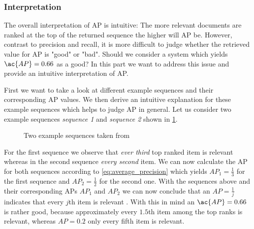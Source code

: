 \subsubsection{Interpretation}
\label{chp:fundamentals:sec:metrics:subsec:average_precision:interpretation}
The overall interpretation of \ac{AP} is intuitive: The more relevant documents are ranked at the top of the returned sequence the higher will \ac{AP} be.
However, contrast to precision and recall, it is more difficult to judge whether the retrieved value for \ac{AP} is "good" or "bad".
Should we consider a system which yields $\ac{AP}=0.66$ as a good?
In this part we want to address this issue and provide an intuitive interpretation of \ac{AP}.

First we want to take a look at different example sequences and their corresponding \ac{AP} values.
We then derive an intuitive explanation for these example sequences which helps to judge \ac{AP} in general.
Let us consider two example sequences \textit{sequence 1} and \textit{sequence 2} shown in \cref{fig:metrics:average_precision:interpreation:sample}.

\begin{figure}[htpb]
    \centering
    \def\svgwidth{\columnwidth}
    
    \caption[Two Example Sequences]{Two example sequences taken from \textcite{Tapaswi:2012}}\label{fig:metrics:average_precision:interpreation:sample}
\end{figure}

For the first sequence we observe that \textit{ever third} top ranked item is relevant whereas in the second sequence \textit{every second} item.
We can now calculate the \ac{AP} for both sequences according to \cref{eq:average_precision} which yields $AP_1= \frac{1}{3}$ for the first sequence and $AP_2= \frac{1}{2}$ for the second one.
With the sequences above and their corresponding \acp{AP} $AP_1$ and $AP_2$ we can now conclude that an $AP=\frac{1}{j}$ indicates that every $j$th item is relevant \parencite{Tapaswi:2012}.
With this in mind an $\ac{AP}=0.66$ is rather good, because approximately every $1.5$th item among the top ranks is relevant, whereas $AP=0.2$ only every fifth item is relevant.
